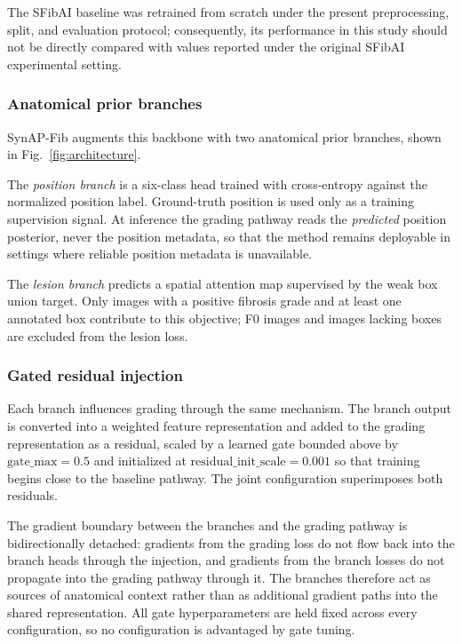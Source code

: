 The SFibAI baseline was retrained from scratch under the present
preprocessing, split, and evaluation protocol; consequently, its performance in
this study should not be directly compared with values reported under the
original SFibAI experimental setting.

\subsubsection{Anatomical prior branches}

SynAP-Fib augments this backbone with two anatomical prior branches, shown in
Fig.~\ref{fig:architecture}.

The \emph{position branch} is a six-class head trained with cross-entropy
against the normalized position label. Ground-truth position is used only as a
training supervision signal. At inference the grading pathway reads the
\emph{predicted} position posterior, never the position metadata, so that the
method remains deployable in settings where reliable position metadata is
unavailable.

The \emph{lesion branch} predicts a spatial attention map supervised by the weak
box union target. Only images with a positive fibrosis grade and at least one
annotated box contribute to this objective; F0 images and images lacking boxes
are excluded from the lesion loss.

\subsubsection{Gated residual injection}

Each branch influences grading through the same mechanism. The branch output is
converted into a weighted feature representation and added to the grading
representation as a residual, scaled by a learned gate bounded above by
$\mathrm{gate\_max}=0.5$ and initialized at
$\mathrm{residual\_init\_scale}=0.001$ so that training begins close to the
baseline pathway. The joint configuration superimposes both residuals.

The gradient boundary between the branches and the grading pathway is
bidirectionally detached: gradients from the grading loss do not flow back into
the branch heads through the injection, and gradients from the branch losses do
not propagate into the grading pathway through it. The branches therefore act as
sources of anatomical context rather than as additional gradient paths into the
shared representation. All gate hyperparameters are held fixed across every
configuration, so no configuration is advantaged by gate tuning.

